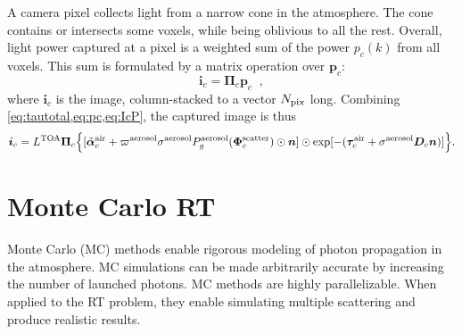 \documentclass[10pt,letterpaper]{article}
\newcommand{\vect}[1]{\bm{#1}}
\begin{document}
A camera pixel collects light from a narrow cone in the
atmosphere. The cone contains or intersects some voxels, while being
oblivious to all the rest.
Overall, light power captured at a pixel is a weighted sum of the
power $p_c(k)$ from all voxels.  This sum is formulated by a matrix
operation over ${\bm p}_c$:
\begin{equation}
  {\bm i}_c= {\vect{\Pi}}_c{\bm p}_c
  \;\;,
  \label{eq:IcP}
\end{equation}
where ${\bm i}_c$ is the image, column-stacked to a vector $N_{\rm
  pix}$ long.  Combining \cref{eq:tautotal,eq:pc,eq:IcP}, the captured
image is thus
\begin{align}
  {\bm i}_c= L^{\rm TOA} {\vect{\Pi}}_c \Big\{
  [\tilde{\vect{\alpha}}^{\rm air}_c + \varpi^{\rm aerosol}\sigma^{\rm
    aerosol} P^{\rm aerosol}_g(\vect{\Phi}^{\rm scatter}_c) \odot{\bm
    n} ] \odot \exp[-(\vect{\tau}_c^{\rm air} + {\sigma}^{\rm aerosol}
  {\bm D}_c{\bm n})] \Big\} .
  \label{eq:bigIA}
\end{align}


\section{Monte Carlo RT}
\label{sec:monte-carlo-simul}

Monte Carlo (MC) methods enable rigorous modeling of photon
propagation in the atmosphere.  MC simulations can be made arbitrarily
accurate by increasing the number of launched photons. MC methods are
highly parallelizable. When applied to the RT problem, they enable
simulating multiple scattering and produce realistic results.
\end{document}
